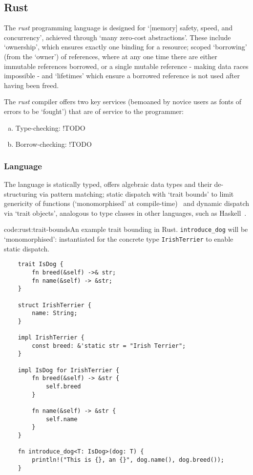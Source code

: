 \subsection{Rust} \label{bg:rust}

The \emph{rust} programming language is designed for `[memory] safety, speed, and concurrency', achieved through `many zero-cost abstractions'. These include `ownership', which ensures exactly one binding for a resource; scoped `borrowing' (from the `owner') of references, where at any one time there are either immutable references borrowed, or a single mutable reference - making data races impossible - and `lifetimes' which ensure a borrowed reference is not used after having been freed. \cite{rust_book}

The \emph{rust} compiler offers two key services (bemoaned by novice users as fonts of errors to be `fought') that are of service to the programmer:
\begin{enumerate}[(a)] \label{bg:rust:compiler-services}
    \item Type-checking: !TODO
    \item Borrow-checking: !TODO
\end{enumerate}

\subsubsection{Language} \label{bg:rust:lang}

The language is statically typed, offers algebraic data types  and their de-structuring via pattern matching; \cite{rust_match_mut_move} static dispatch with `trait bounds' to limit genericity of functions (`monomorphised' at compile-time)~\cite{rust_book} and dynamic dispatch via `trait objects', analogous to type classes in other languages, such as Haskell~\cite{rust_functional}. \cite{rust_type_system}

\begin{codelisting}{code:rust:trait-bounds}{An example trait bounding in Rust. \texttt{introduce_dog} will be `monomorphised': instantiated for the concrete type \texttt{IrishTerrier} to enable static dispatch.}
\begin{spacing}{\codespacing}
\begin{verbatim}
    trait IsDog {
        fn breed(&self) ->& str;
        fn name(&self) -> &str;
    }
    
    struct IrishTerrier {
        name: String;
    }
    
    impl IrishTerrier {
        const breed: &'static str = "Irish Terrier";
    }
    
    impl IsDog for IrishTerrier {
        fn breed(&self) -> &str {
        	self.breed
        }
        
        fn name(&self) -> &str {
        	self.name
        }
    }
    
    fn introduce_dog<T: IsDog>(dog: T) {
        println!("This is {}, an {}", dog.name(), dog.breed());
    }
\end{verbatim}
\end{spacing}
\end{codelisting}

